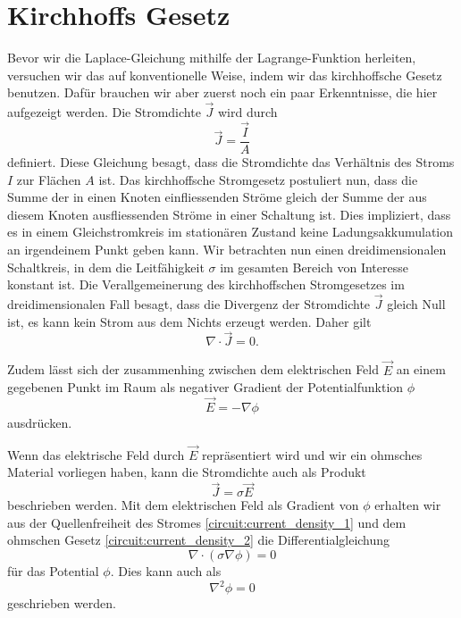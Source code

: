 %
%
%
%
\section{Kirchhoffs Gesetz
\label{circuit:section:teil1}}
Bevor wir die Laplace-Gleichung mithilfe der Lagrange-Funktion herleiten, versuchen wir das auf konventionelle Weise, indem wir  das kirchhoffsche Gesetz benutzen. 
Dafür brauchen wir aber zuerst noch ein paar Erkenntnisse, die hier aufgezeigt werden. Die Stromdichte $\vec{J}$ wird durch
\begin{equation}
	\vec{J}=\frac{\vec{I}}{A}
	\label{circuit:current_density_3}
\end{equation}
definiert. Diese Gleichung besagt, dass die Stromdichte das Verhältnis des Stroms $I$ zur Flächen $A$ ist. 
Das kirchhoffsche Stromgesetz postuliert nun, dass die Summe der in einen Knoten einfliessenden Ströme gleich der Summe der aus diesem Knoten ausfliessenden Ströme in einer Schaltung ist. Dies impliziert, dass es in einem Gleichstromkreis im stationären Zustand keine Ladungsakkumulation an irgendeinem Punkt geben kann. Wir betrachten nun einen dreidimensionalen Schaltkreis, in dem die Leitfähigkeit $\sigma$ im gesamten Bereich von Interesse konstant ist. Die Verallgemeinerung des kirchhoffschen Stromgesetzes im dreidimensionalen Fall besagt, dass die Divergenz der Stromdichte $\vec{J}$ gleich Null ist, es kann kein Strom aus dem Nichts erzeugt werden. Daher gilt 
\begin{equation}
	\nabla \cdot  \vec{J}=0.
	\label{circuit:current_density_1}
\end{equation}

Zudem lässt sich der zusammenhing zwischen dem elektrischen Feld $\vec{E}$ an einem gegebenen Punkt im Raum als negativer Gradient der Potentialfunktion $\phi$ 
\begin{equation}
	\vec{E}=-\nabla \phi
	\label{circuit:current_density_4}
\end{equation}
ausdrücken.

Wenn das elektrische Feld durch $\vec{E}$ repräsentiert wird und wir ein ohmsches Material vorliegen haben, kann die Stromdichte auch als Produkt  
\begin{equation}
\vec{J}=\sigma \vec{E}
\label{circuit:current_density_2}
\end{equation}
beschrieben werden.
Mit dem elektrischen Feld als Gradient von $\phi$ erhalten wir aus der Quellenfreiheit des Stromes \eqref{circuit:current_density_1} und dem ohmschen Gesetz \eqref{circuit:current_density_2} die Differentialgleichung 
\begin{equation}
	\nabla \cdot (\sigma \nabla \phi)=0
	\label{circuit:current_density_5}
\end{equation}
für das Potential $\phi$. Dies kann auch als
\begin{equation}
\nabla^2 \phi=0
\label{circuit:current_density_6}
\end{equation}
geschrieben werden.

